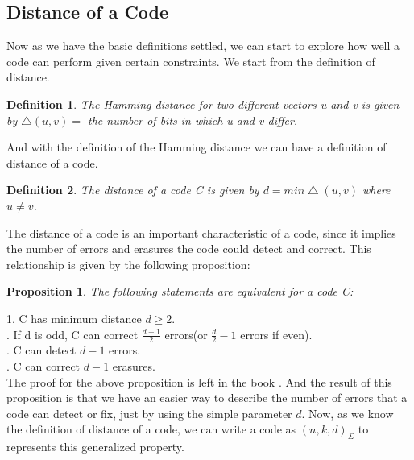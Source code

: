 \documentclass{article}
\newtheorem{Definition}{Definition}
\newtheorem{Proposition}{Proposition}
\begin{document}
\subsection{Distance of a Code}
Now as we have the basic definitions settled, we can start to explore how well a code can perform given certain constraints. We start from the definition of distance.
\begin{Definition}The Hamming distance for two different vectors u and v is given by $\bigtriangleup(u,v) = $ the number of bits in which u and v differ.
\end{Definition}
\noindent And with the definition of the Hamming distance we can have a definition of distance of a code.
\begin{Definition}
The distance of a code C is given by $d = min \bigtriangleup (u,v)$ where $u \neq v$.
\end{Definition}
\noindent The distance of a code is an important characteristic of a code, since it implies the number of errors and erasures the code could detect and correct. This relationship is given by the following proposition:
\begin{Proposition}The following statements are equivalent for a code C:\end{Proposition}
1. \quad C has minimum distance $d \ge 2$.\\
. \quad If d is odd, C can correct $\frac{d-1}{2}$ errors(or $\frac{d}{2}-1$ errors if even).\\
. \quad C can detect $d-1$ errors.\\
. \quad C can correct $d-1$ erasures.\\
The proof for the above proposition is left in the book \cite{book}. And the result of this proposition is that we have an easier way to describe the number of errors that a code can detect or fix, just by using the simple parameter $d$. Now, as we know the definition of distance of a code, we can write a code as $(n,k,d)_\Sigma$ to represents this generalized property.
\end{document}

